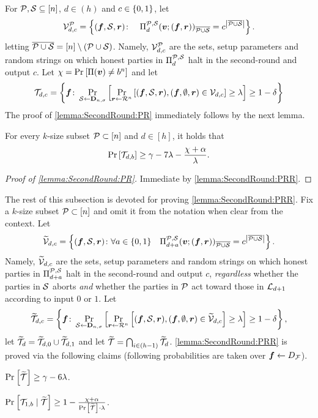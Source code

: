 For  $\mathcal{P}, \mathcal{S} \subseteq [n]$,  $d\in (h)$ and  $c\in \{0,1\}$,  let
$$
\mathcal{V}^{\mathcal{P}}_{d,c} = \left\{({ \boldsymbol{f}},{\cal{S}},{ \boldsymbol{r}}) \colon  \quad \Pi^{\mathcal{P},\mathcal{S}}_d({ \boldsymbol{v}};({ \boldsymbol{f}},{ \boldsymbol{r}}))_{\overline{\mathcal{P} \cup \mathcal{S}}} = c^{\left|{\overline{\mathcal{P} \cup \mathcal{S}}}\right|}\right\}.
$$
letting ${\overline{\mathcal{P} \cup \mathcal{S}}} = [n] \setminus (\mathcal{P} \cup {\cal{S}})$.		 Namely,  $\mathcal{V}^{\mathcal{P}}_{d,c} $ are the sets, setup parameters and random strings  on  which  honest parties in $\Pi^{\mathcal{P},\mathcal{S}}_{d}$  halt in the second-round and output $c$. Let $\chi =  \Pr_{}\left[ \Pi({ \boldsymbol{v}}) \ne b^n\right] $ and let
$$
\mathcal{T}_{d,c} = \left\{{ \boldsymbol{f}} \colon \Pr_{{\cal{S}} \gets \mathbf{D}_{n,\sigma}}\left[\Pr_{{ \boldsymbol{r}} \gets \mathcal{R}^n}\left[({ \boldsymbol{f}},\mathcal{S},{ \boldsymbol{r}}),({ \boldsymbol{f}},\emptyset,{ \boldsymbol{r}}) \in \mathcal{V}_{d,c} \right] \ge \lambda \right] \ge 1-\delta\right\}
$$
The proof of   \cref{lemma:SecondRound:PR} immediately follows by  the  next lemma.
\begin{lemma}\label{lemma:SecondRound:PRR}
For  every  $k$-size subset $\mathcal{P} \subset [n]$   and  $d\in [h]$, it holds that
\begin{align*}
\Pr_{}\left[\mathcal{T}_{d,b} \right] \ge   \gamma- 7\lambda- \frac{\chi + \alpha }{\lambda}.
\end{align*}
\end{lemma}
\begin{proof}[Proof of \cref{lemma:SecondRound:PR}]
Immediate by \cref{lemma:SecondRound:PRR}.
\end{proof}
\newcommand{\tV}{\widetilde{\cV}}
\newcommand{\tT}{{\widetilde{\cT}}}


The rest of this subsection is devoted for proving  \cref{lemma:SecondRound:PRR}. Fix  a $k$-size subset $\mathcal{P} \subset [n]$  and omit it from the notation when clear from the context.
Let
$$
\tV_{d,c} = \set{(\vf,\cs,\vr) \colon   \forall a\in \zo   \quad \PP_{d+a}(\vv;(\vf,\vr))_\ops = c^{\size{\ops}}}.
$$
Namely,  $\tV_{d,c}$ are the sets, setup parameters and random strings  on  which  honest parties in $\Pi^{\mathcal{P},\mathcal{S}}_{d+a}$  halt in the second-round and output $c$,  \emph{regardless} whether the parties in $\mathcal{S}$ aborts \emph{and} whether the parties in $\mathcal{P}$ act toward those in ${\cal{L}}_{d+1}$ according to input $0$ or $1$.
Let
$$
\tT_{d,c} = \set{\vf \colon \ppr{\cs \gets \bns}{\ppr{\vr \gets \rn}{(\vf,\cS,\vr),(\vf,\emptyset,\vr) \in \tV_{d,c} } \ge \lambda} \ge 1-\delta},
$$
let $\tT_{d} = \tT_{d,0}\cup \tT_{d,1}$ and let  $\tT = \bigcap_{i \in (h-1)}\tT_{d}$. \cref{lemma:SecondRound:PRR} is proved via the following claims (following  probabilities are taken over $ { \boldsymbol{f}}  \gets D_{\cal F}$).


\begin{claim}\label{claim:PR:00}
$\pr{\tT} \ge   \gamma- 6\lambda$.
\end{claim}


\begin{claim}\label{claim:PR:01}
$\pr{\cT_{1,\o} \mid \tT} \ge   1- \frac{\chi + \alpha }{\pr{\tT}\cdot \lambda}$.
\end{claim}


